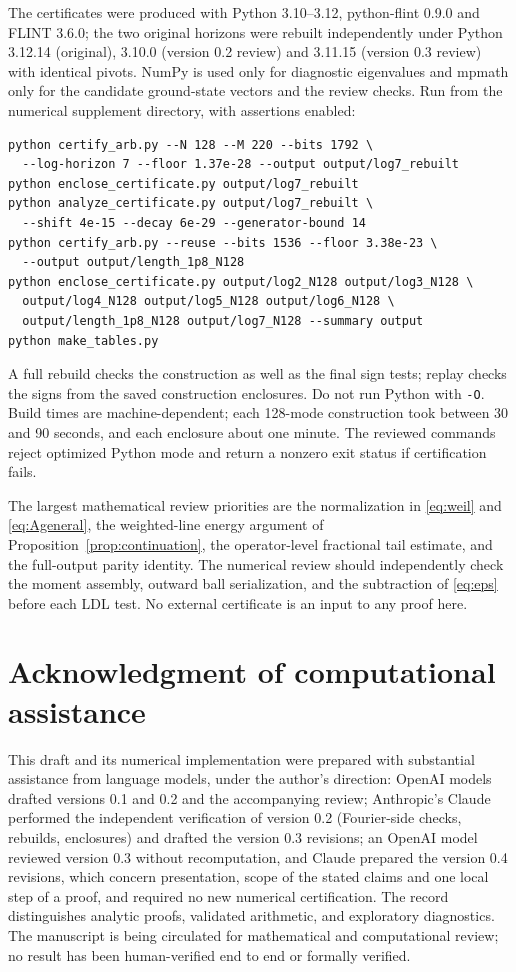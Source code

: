 \documentclass[11pt]{article}
\numberwithin{equation}{section}
\theoremstyle{definition}
\theoremstyle{remark}
\begin{document}
The certificates were produced with Python 3.10--3.12, python-flint 0.9.0 and
FLINT 3.6.0; the two original horizons were rebuilt independently under Python
3.12.14 (original), 3.10.0 (version 0.2 review) and 3.11.15 (version 0.3
review) with identical pivots. NumPy is used only for diagnostic eigenvalues
and mpmath only for the candidate ground-state vectors and the review checks.
Run from the numerical supplement directory, with assertions enabled:
\begin{verbatim}
python certify_arb.py --N 128 --M 220 --bits 1792 \
  --log-horizon 7 --floor 1.37e-28 --output output/log7_rebuilt
python enclose_certificate.py output/log7_rebuilt
python analyze_certificate.py output/log7_rebuilt \
  --shift 4e-15 --decay 6e-29 --generator-bound 14
python certify_arb.py --reuse --bits 1536 --floor 3.38e-23 \
  --output output/length_1p8_N128
python enclose_certificate.py output/log2_N128 output/log3_N128 \
  output/log4_N128 output/log5_N128 output/log6_N128 \
  output/length_1p8_N128 output/log7_N128 --summary output
python make_tables.py
\end{verbatim}
A full rebuild checks the construction as well as the final sign tests;
replay checks the signs from the saved construction enclosures. Do not run
Python with \texttt{-O}. Build times are machine-dependent; each 128-mode
construction took between 30 and 90 seconds, and each enclosure about one
minute. The reviewed commands reject optimized Python mode and return a
nonzero exit status if certification fails.

The largest mathematical review priorities are the normalization in
\eqref{eq:weil} and \eqref{eq:Ageneral}, the weighted-line energy argument of
Proposition~\ref{prop:continuation}, the operator-level fractional tail
estimate, and the full-output parity identity. The numerical review should
independently check the moment assembly, outward ball serialization, and the
subtraction of \eqref{eq:eps} before each LDL test. No external certificate is
an input to any proof here.

\section*{Acknowledgment of computational assistance}
This draft and its numerical implementation were prepared with substantial
assistance from language models, under the author's direction: OpenAI models
drafted versions 0.1 and 0.2 and the accompanying review; Anthropic's Claude
performed the independent verification of version 0.2 (Fourier-side checks,
rebuilds, enclosures) and drafted the version 0.3 revisions; an OpenAI model
reviewed version 0.3 without recomputation, and Claude prepared the version
0.4 revisions, which concern presentation, scope of the stated claims and one
local step of a proof, and required no new numerical certification. The record
distinguishes analytic proofs, validated arithmetic, and exploratory
diagnostics. The manuscript is being circulated for mathematical and
computational review; no result has been human-verified end to end or
formally verified.



\end{document}

